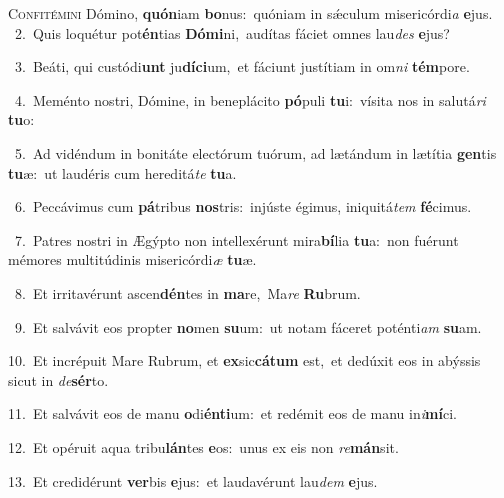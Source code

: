 \lettrine{\initial\textcolor{\initialcolor}{C}}{onfitémini} Dómino, \textbf{quón}\-iam \textbf{bo}\-nus:~\star quóniam in sǽculum misericórdi\textit{a} \textbf{e}\-jus.\\
{\numbfont\textcolor{\numbcolor}{~2.}}~Quis loquétur pot\-\textbf{én}\-tias \textbf{Dó}\-\textbf{mi}ni,~\star audítas fáciet omnes lau\textit{des} \textbf{e}\-jus?\par
{\numbfont\textcolor{\numbcolor}{~3.}}~Beáti, qui custódi\textbf{unt} ju\-\textbf{dí}\-\textbf{ci}um,~\star et fáciunt justítiam in om\textit{ni} \textbf{tém}\-pore.\par
{\numbfont\textcolor{\numbcolor}{~4.}}~Meménto nostri, Dómine, in beneplácito \textbf{pó}\-puli \textbf{tu}\-i:~\star vísita nos in salutá\textit{ri} \textbf{tu}\-o:\par
{\numbfont\textcolor{\numbcolor}{~5.}}~Ad vidéndum in bonitáte electórum tuórum, ad lætándum in lætítia \textbf{gen}\-tis \textbf{tu}\-æ:~\star ut laudéris cum hereditá\textit{te} \textbf{tu}\-a.\par
{\numbfont\textcolor{\numbcolor}{~6.}}~Peccávimus cum \textbf{pá}\-tribus \textbf{nos}\-tris:~\star injúste égimus, iniquitá\textit{tem} \textbf{fé}\-cimus.\par
{\numbfont\textcolor{\numbcolor}{~7.}}~Patres nostri in Ægýpto non intellexérunt mira\-\textbf{bí}\-lia \textbf{tu}\-a:~\star non fuérunt mémores multitúdinis misericórdi\textit{æ} \textbf{tu}\-æ.\par
{\numbfont\textcolor{\numbcolor}{~8.}}~Et irritavérunt ascen\-\textbf{dén}\-tes in \textbf{ma}\-re,~\star Ma\textit{re} \textbf{Ru}\-brum.\par
{\numbfont\textcolor{\numbcolor}{~9.}}~Et salvávit eos propter \textbf{no}\-men \textbf{su}\-um:~\star ut notam fáceret poténti\textit{am} \textbf{su}\-am.\par
{\numbfont\textcolor{\numbcolor}{10.}}~Et incrépuit Mare Rubrum, et \textbf{ex}\-sic\-\textbf{cá}\-\textbf{tum} est,~\star et dedúxit eos in abýssis sicut in \textit{de}\-\textbf{sér}to.\par
{\numbfont\textcolor{\numbcolor}{11.}}~Et salvávit eos de manu \textbf{o}\-di\-\textbf{én}\-\textbf{ti}um:~\star et redémit eos de manu in\-\textit{i}\-\textbf{mí}ci.\par
{\numbfont\textcolor{\numbcolor}{12.}}~Et opéruit aqua tribu\-\textbf{lán}\-tes \textbf{e}\-os:~\star unus ex eis non \textit{re}\-\textbf{mán}sit.\par
{\numbfont\textcolor{\numbcolor}{13.}}~Et credidérunt \textbf{ver}\-bis \textbf{e}\-jus:~\star et laudavérunt lau\textit{dem} \textbf{e}\-jus.\par
